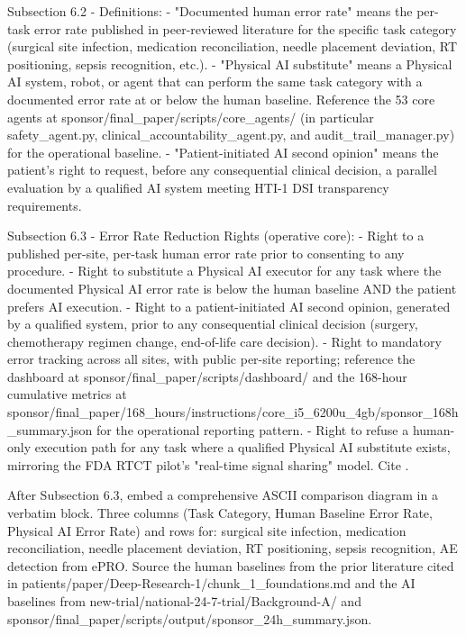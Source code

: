 Subsection 6.2 - Definitions:
- "Documented human error rate" means the per-task error rate
  published in peer-reviewed literature for the specific task
  category (surgical site infection, medication reconciliation,
  needle placement deviation, RT positioning, sepsis recognition,
  etc.).
- "Physical AI substitute" means a Physical AI system, robot, or
  agent that can perform the same task category with a documented
  error rate at or below the human baseline. Reference the 53 core
  agents at sponsor/final\_paper/scripts/core\_agents/ (in particular
  safety\_agent.py, clinical\_accountability\_agent.py, and
  audit\_trail\_manager.py) for the operational baseline.
- "Patient-initiated AI second opinion" means the patient's right to
  request, before any consequential clinical decision, a parallel
  evaluation by a qualified AI system meeting HTI-1 DSI transparency
  requirements.

Subsection 6.3 - Error Rate Reduction Rights (operative core):
- Right to a published per-site, per-task human error rate prior to
  consenting to any procedure.
- Right to substitute a Physical AI executor for any task where the
  documented Physical AI error rate is below the human baseline AND
  the patient prefers AI execution.
- Right to a patient-initiated AI second opinion, generated by a
  qualified system, prior to any consequential clinical decision
  (surgery, chemotherapy regimen change, end-of-life care decision).
- Right to mandatory error tracking across all sites, with public
  per-site reporting; reference the dashboard at
  sponsor/final\_paper/scripts/dashboard/ and the 168-hour cumulative
  metrics at sponsor/final\_paper/168\_hours/instructions/core\_i5\_6200u\_4gb/sponsor\_168h\_summary.json
  for the operational reporting pattern.
- Right to refuse a human-only execution path for any task where a
  qualified Physical AI substitute exists, mirroring the FDA RTCT
  pilot's "real-time signal sharing" model. Cite
  \cite{fda_rtct_press_2026}.

After Subsection 6.3, embed a comprehensive ASCII comparison diagram
in a verbatim block. Three columns (Task Category, Human Baseline
Error Rate, Physical AI Error Rate) and rows for: surgical site
infection, medication reconciliation, needle placement deviation, RT
positioning, sepsis recognition, AE detection from ePRO. Source the
human baselines from the prior literature cited in
patients/paper/Deep-Research-1/chunk\_1\_foundations.md and the AI
baselines from
new-trial/national-24-7-trial/Background-A/ and
sponsor/final\_paper/scripts/output/sponsor\_24h\_summary.json.

